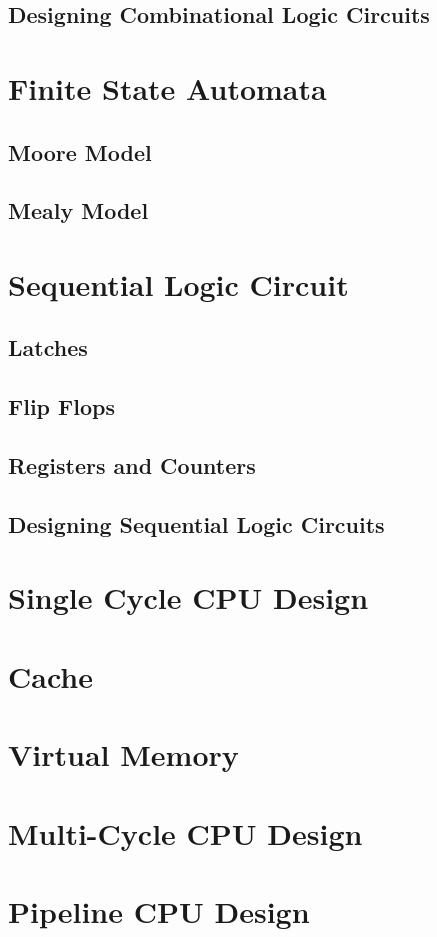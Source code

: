 \documentclass[11pt]{article}
\begin{document}
\subsection{Designing Combinational Logic Circuits}

\section{Finite State Automata}

\subsection{Moore Model}

\subsection{Mealy Model}

\section{Sequential Logic Circuit}

\subsection{Latches}

\subsection{Flip Flops}

\subsection{Registers and Counters}

\subsection{Designing Sequential Logic Circuits}

\section{Single Cycle CPU Design}

\section{Cache}

\section{Virtual Memory}

\section{Multi-Cycle CPU Design}

\section{Pipeline CPU Design}
\end{document}

